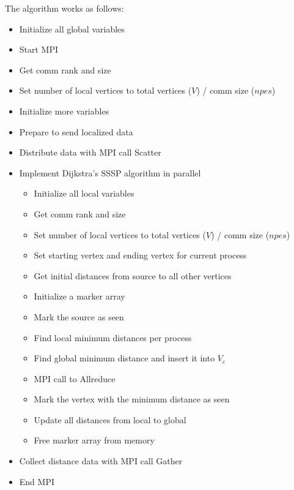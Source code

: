 	\newpage
	The algorithm works as follows:
	\begin{itemize}
		\item Initialize all global variables
		\item Start MPI
		\item Get comm rank and size
		\item Set number of local vertices to total vertices ($V$) / comm size ($npes$)
		\item Initialize more variables
		\item Prepare to send localized data
		\item Distribute data with MPI call Scatter\cite{MPIScatter}
		\item Implement Dijkstra's SSSP algorithm in parallel
		\begin{itemize}
			\item Initialize all local variables
			\item Get comm rank and size
			\item Set number of local vertices to total vertices ($V$) / comm size ($npes$)
			\item Set starting vertex and ending vertex for current process
			\item Get initial distances from source to all other vertices
			\item Initialize a marker array
			\item Mark the source as seen
			\item Find local minimum distances per process
			\item Find global minimum distance and insert it into $V_c$
			\item MPI call to Allreduce\cite{MPIAllreduce}
			\item Mark the vertex with the minimum distance as seen
			\item Update all distances from local to global
			\item Free marker array from memory
		\end{itemize}
		\item Collect distance data with MPI call Gather\cite{MPIGather}
		\item End MPI
	\end{itemize}
	
